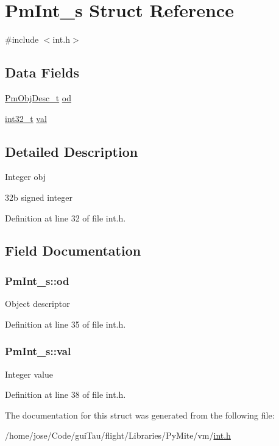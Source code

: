 \hypertarget{struct_pm_int__s}{\section{Pm\-Int\-\_\-s Struct Reference}
\label{struct_pm_int__s}
}


{\ttfamily \#include $<$int.\-h$>$}

\subsection*{Data Fields}
\begin{DoxyCompactItemize}
\item 
\hyperlink{obj_8h_a72d816790acd8eb550fb25268c2b3489}{Pm\-Obj\-Desc\-\_\-t} \hyperlink{struct_pm_int__s_af64685a6b5bc045e224600f60d0d9cf7}{od}
\item 
\hyperlink{group___n_a_m_e_gafd12020da5a235dfcf0c3c748fb5baed}{int32\-\_\-t} \hyperlink{struct_pm_int__s_a53114e5d53a3789b999ba58686bee8cd}{val}
\end{DoxyCompactItemize}


\subsection{Detailed Description}
Integer obj

32b signed integer 

Definition at line 32 of file int.\-h.



\subsection{Field Documentation}
\hypertarget{struct_pm_int__s_af64685a6b5bc045e224600f60d0d9cf7}{
\subsubsection[{od}]{ Pm\-Int\-\_\-s\-::od}}\label{struct_pm_int__s_af64685a6b5bc045e224600f60d0d9cf7}
Object descriptor 

Definition at line 35 of file int.\-h.

\hypertarget{struct_pm_int__s_a53114e5d53a3789b999ba58686bee8cd}{
\subsubsection[{val}]{ Pm\-Int\-\_\-s\-::val}}\label{struct_pm_int__s_a53114e5d53a3789b999ba58686bee8cd}
Integer value 

Definition at line 38 of file int.\-h.



The documentation for this struct was generated from the following file\-:\begin{DoxyCompactItemize}
\item 
/home/jose/\-Code/gui\-Tau/flight/\-Libraries/\-Py\-Mite/vm/\hyperlink{int_8h}{int.\-h}\end{DoxyCompactItemize}
